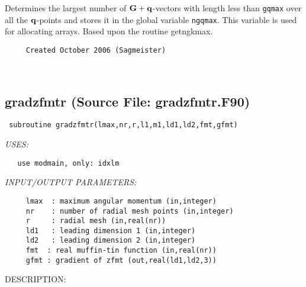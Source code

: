 \documentclass[11pt]{article}
\begin{document}
     Determines the largest number of ${\bf G+q}$-vectors with length less than
     {\tt gqmax} over all the ${\bf q}$-points and stores it in the global
     variable {\tt ngqmax}. This variable is used for allocating arrays.
     Based upon the routine getngkmax.
  
\begin{verbatim}     Created October 2006 (Sagmeister)\end{verbatim}


















 
 
\mbox{}\hrulefill\ 
 
\subsection{gradzfmtr (Source File: gradzfmtr.F90)}


\begin{verbatim} subroutine gradzfmtr(lmax,nr,r,l1,m1,ld1,ld2,fmt,gfmt)\end{verbatim}{\em USES:}
\begin{verbatim}   use modmain, only: idxlm\end{verbatim}{\em INPUT/OUTPUT PARAMETERS:}
\begin{verbatim}     lmax  : maximum angular momentum (in,integer)
     nr    : number of radial mesh points (in,integer)
     r     : radial mesh (in,real(nr))
     ld1   : leading dimension 1 (in,integer)
     ld2   : leading dimension 2 (in,integer)
     fmt  : real muffin-tin function (in,real(nr))
     gfmt : gradient of zfmt (out,real(ld1,ld2,3))\end{verbatim}
{\sf DESCRIPTION:\\ }
\end{document}
